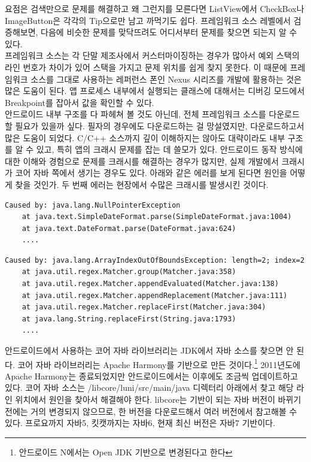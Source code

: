 요점은 검색만으로 문제를 해결하고 왜 그런지를 모른다면 ListView에서 CheckBox나 ImageButton은 각각의 Tip으로만 남고 까먹기도 쉽다. 프레임워크 소스 레벨에서 검증해보면, 다음에 비슷한 문제를 맞닥뜨려도 어디서부터 문제를 찾으면 되는지 알 수 있다.\\

프레임워크 소스는 각 단말 제조사에서 커스터마이징하는 경우가 많아서 예외 스택의 라인 번호가 차이가 있어 스택을 가지고 문제 위치를 쉽게 찾지 못한다. 이 때문에 프레임워크 소스를 그대로 사용하는 레퍼런스 폰인 Nexus 시리즈를 개발에 활용하는 것은 많은 도움이 된다. 앱 프로세스 내부에서 실행되는 클래스에 대해서는 디버깅 모드에서 Breakpoint를 잡아서 값을 확인할 수 있다.\\

안드로이드 내부 구조를 다 파헤쳐 볼 것도 아닌데, 전체 프레임워크 소스를 다운로드할 필요가 있을까 싶다. 필자의 경우에도 다운로드하는 걸 망설였지만, 다운로드하고서 많은 도움이 되었다. C/C++ 소스까지 깊이 이해하지는 않아도 대략이라도 내부 구조를 알 수 있고, 특히 앱의 크래시 문제를 잡는 데 쓸모가 있다. 
안드로이드 동작 방식에 대한 이해와 경험으로 문제를 크래시를 해결하는 경우가 많지만, 실제 개발에서 크래시가 코어 자바 쪽에서 생기는 경우도 있다.
아래와 같은 에러를 보게 된다면 원인을 어떻게 찾을 것인가. 두 번째 에러는 현장에서 수많은 크래시를 발생시킨 것이다.
\begin{lstlisting}[frame=single]
Caused by: java.lang.NullPointerException
	at java.text.SimpleDateFormat.parse(SimpleDateFormat.java:1004)
	at java.text.DateFormat.parse(DateFormat.java:624)
	....
\end{lstlisting}

\begin{lstlisting}[frame=single]
Caused by: java.lang.ArrayIndexOutOfBoundsException: length=2; index=2
	at java.util.regex.Matcher.group(Matcher.java:358)
	at java.util.regex.Matcher.appendEvaluated(Matcher.java:138)
	at java.util.regex.Matcher.appendReplacement(Matcher.java:111)
	at java.util.regex.Matcher.replaceFirst(Matcher.java:304)
	at java.lang.String.replaceFirst(String.java:1793)
	....
\end{lstlisting}

안드로이드에서 사용하는 코어 자바 라이브러리는 JDK에서 자바 소스를 찾으면 안 된다. 
코어 자바 라이브러리는 Apache Harmony를 기반으로 만든 것이다.\footnote{안드로이드 N에서는 Open JDK 기반으로 변경된다고 한다} 2011년도에 Apache Harmony는 종료되었지만 안드로이드에서는 이후에도 조금씩 업데이트하고 있다. 
코어 자바 소스는 /libcore/luni/src/main/java 디렉터리 아래에서 찾고 해당 라인 위치에서 원인을 찾아서 해결해야 한다.  
libcore는 기반이 되는 자바 버전이 바뀌기 전에는 거의 변경되지 않으므로, 한 버전을 다운로드해서 여러 버전에서 참고해볼 수 있다. 프로요까지 자바5, 킷캣까지는 자바6, 현재 최신 버전은 자바7 기반이다.

